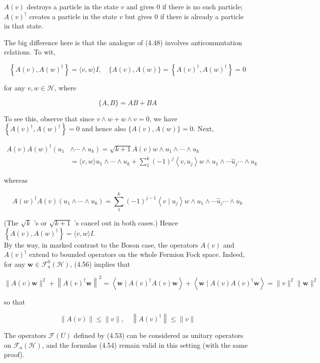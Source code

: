\documentclass[10pt, letterpaper]{article}
\begin{document}
$A(v)$ destroys a particle in the state $v$ and gives 0 if there is no such particle; $A(v)^{\dagger}$ creates a particle in the state $v$ but gives 0 if there is already a particle in that state.

The big difference here is that the analogue of (4.48) involves anticommutation relations. To wit,

$$
\left\{A(v), A(w)^{\dagger}\right\}=\langle v, w\rangle I, \quad\{A(v), A(w)\}=\left\{A(v)^{\dagger}, A(w)^{\dagger}\right\}=0
$$

for any $v, w \in \mathcal{H}$, where

$$
\{A, B\}=A B+B A
$$

To see this, observe that since $v \wedge w+w \wedge v=0$, we have $\left\{A(v)^{\dagger}, A(w)^{\dagger}\right\}=0$ and hence also $\{A(v), A(w)\}=0$. Next,

$$
\begin{aligned}
A(v) A(w)^{\dagger}\left(u_{1}\right. & \left.\wedge \cdots \wedge u_{k}\right)=\sqrt{k+1} A(v) w \wedge u_{1} \wedge \cdots \wedge u_{k} \\
& =\langle v, w\rangle u_{1} \wedge \cdots \wedge u_{k}+\sum_{1}^{k}(-1)^{j}\left\langle v, u_{j}\right\rangle w \wedge u_{1} \wedge \cdots \widehat{u}_{j} \cdots \wedge u_{k}
\end{aligned}
$$

whereas

$$
A(w)^{\dagger} A(v)\left(u_{1} \wedge \cdots \wedge u_{k}\right)=\sum_{1}^{k}(-1)^{j-1}\left\langle v \mid u_{j}\right\rangle w \wedge u_{1} \wedge \cdots \widehat{u}_{j} \cdots \wedge u_{k}
$$

(The $\sqrt{k}$ 's or $\sqrt{k+1}$ 's cancel out in both cases.) Hence $\left\{A(v), A(w)^{\dagger}\right\}=\langle v, w\rangle I$.\\
By the way, in marked contrast to the Boson case, the operators $A(v)$ and $A(v)^{\dagger}$ extend to bounded operators on the whole Fermion Fock space. Indeed, for any $\mathbf{w} \in \mathcal{F}_{a}^{0}(\mathcal{H})$, (4.56) implies that

$$
\|A(v) \mathbf{w}\|^{2}+\left\|A(v)^{\dagger} \mathbf{w}\right\|^{2}=\left\langle\mathbf{w} \mid A(v)^{\dagger} A(v) \mathbf{w}\right\rangle+\left\langle\mathbf{w} \mid A(v) A(v)^{\dagger} \mathbf{w}\right\rangle=\|v\|^{2}\|\mathbf{w}\|^{2}
$$

so that

$$
\|A(v)\| \leq\|v\|, \quad\left\|A(v)^{\dagger}\right\| \leq\|v\|
$$

The operators $\mathcal{F}(U)$ defined by (4.53) can be considered as unitary operators on $\mathcal{F}_{a}(\mathcal{H})$, and the formulas (4.54) remain valid in this setting (with the same proof).
\end{document}
